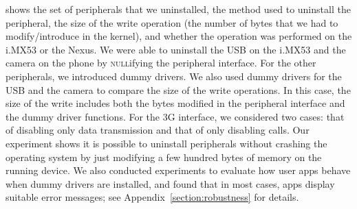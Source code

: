  shows the set of peripherals that we uninstalled, the
method used to uninstall the peripheral, the size of the write operation (the
number of bytes that we had to modify/introduce in the kernel), and whether the
operation was performed on the i.MX53 or the Nexus. We were able to uninstall
the USB on the i.MX53 and the camera on the phone by \textsc{null}ifying the
peripheral interface. For the other peripherals, we introduced dummy drivers.
We also used dummy drivers for the USB and the camera to compare the size of
the write operations. In this case, the size of the write includes both the
bytes modified in the peripheral interface and the dummy driver functions. For
the 3G interface, we considered two cases: that of disabling only data
transmission and that of only disabling calls. Our experiment shows it is
possible to uninstall peripherals without crashing the operating system by just
modifying a few hundred bytes of memory on the running device. We also
conducted experiments to evaluate how user apps behave when dummy drivers are
installed, and found that in most cases, apps display suitable error messages;
see Appendix~\ref{section:robustness} for details.
